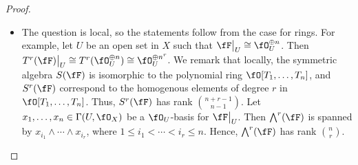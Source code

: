 \documentclass[a4paper]{article}
\begin{document}
\begin{enumerate} [label=\textbf{\arabic*.}, leftmargin=0em]
\begin{proof} $ $ \vspace{0pt}
\begin{itemize} [leftmargin=0cm]
\item[(a)] The question is local, so the statements follow from the case for rings. For example, let $U$ be an open set in $X$ such that $\restr{\fF}{U} \cong \fO_U^{\oplus n}$. Then $\restr{T^r(\fF)}{U} \cong T^r(\fO_U^{\oplus n}) \cong \fO_U^{\oplus n^r}$. We remark that locally, the symmetric algebra $S(\fF)$ is isomorphic to the polynomial ring $\fO[T_1, \dots, T_n]$, and $S^r(\fF)$ correspond to the homogenous elements of degree $r$ in $\fO[T_1, \dots, T_n]$.
Thus, $S^r(\fF)$ has rank $\binom{n + r - 1}{n - 1}$. Let $x_1, \dots, x_n \in \Gamma(U, \fO_X)$ be a $\fO_U$-basis for $\restr{\fF}{U}$. Then $\bigwedge^r(\fF)$ is spanned by $x_{i_1} \wedge \cdots \wedge x_{i_r}$, where $1 \leq i_1 < \cdots < i_r \leq n$. Hence, $\bigwedge^r(\fF)$ has rank $\binom{n}{r}$.
\end{itemize}
\end{proof}

\end{enumerate}
\end{document}
